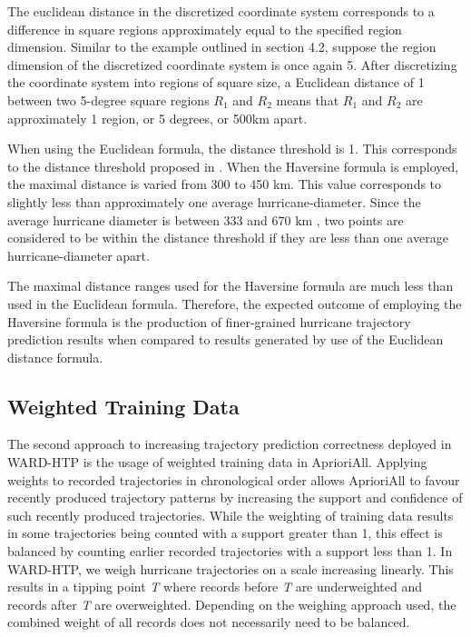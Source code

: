 \documentclass[12pt,conference]{IEEEtran}
\begin{document}
The euclidean distance in the discretized coordinate system corresponds to a difference in square regions approximately equal to the specified region dimension. Similar to the example outlined in section 4.2, suppose the region dimension of the discretized coordinate system is once again 5. After discretizing the coordinate system into regions of square size, a Euclidean distance of 1 between two 5-degree square regions $R_{1}$ and $R_{2}$ means that $R_{1}$ and $R_{2}$ are approximately 1 region, or 5 degrees, or 500km apart. 

When using the Euclidean formula, the distance threshold is 1. This corresponds to the distance threshold proposed in \cite{major-hurricane-model}. When the Haversine formula is employed, the maximal distance is varied from 300 to 450 km. This value corresponds to slightly less than approximately one average hurricane-diameter. Since the average hurricane diameter is between 333 and 670 km \cite{hurricane-distances}, two points are considered to be within the distance threshold if they are less than one average hurricane-diameter apart. 

The maximal distance ranges used for the Haversine formula are much less than used in the Euclidean formula. Therefore, the expected outcome of employing the Haversine formula is the production of finer-grained hurricane trajectory prediction results when compared to results generated by use of the Euclidean distance formula.

\subsection{Weighted Training Data}

The second approach to increasing trajectory prediction correctness deployed in WARD-HTP is the usage of weighted training data in AprioriAll. Applying weights to recorded trajectories in chronological order allows AprioriAll to favour recently produced trajectory patterns by increasing the support and confidence of such recently produced trajectories. While the weighting of training data results in some trajectories being counted with a support greater than 1, this effect is balanced by counting earlier recorded trajectories with a support less than 1. In WARD-HTP, we weigh hurricane trajectories on a scale increasing linearly. This results in a tipping point \textit{T} where records before \textit{T} are underweighted and records after \textit{T} are overweighted. Depending on the weighing approach used, the combined weight of all records does not necessarily need to be balanced.
\end{document}
